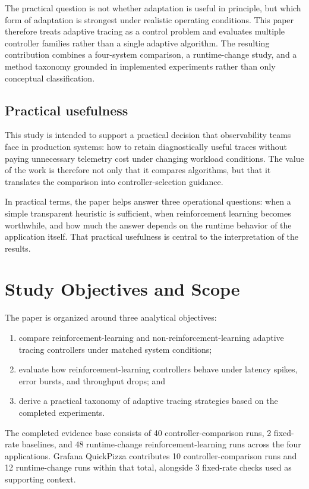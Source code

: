 \documentclass[10pt,twocolumn]{article}
\begin{document}
The practical question is not whether adaptation is useful in principle, but which form of adaptation is strongest under realistic operating conditions. This paper therefore treats adaptive tracing as a control problem and evaluates multiple controller families rather than a single adaptive algorithm. The resulting contribution combines a four-system comparison, a runtime-change study, and a method taxonomy grounded in implemented experiments rather than only conceptual classification.

\subsection{Practical usefulness}
This study is intended to support a practical decision that observability teams face in production systems: how to retain diagnostically useful traces without paying unnecessary telemetry cost under changing workload conditions. The value of the work is therefore not only that it compares algorithms, but that it translates the comparison into controller-selection guidance.

In practical terms, the paper helps answer three operational questions: when a simple transparent heuristic is sufficient, when reinforcement learning becomes worthwhile, and how much the answer depends on the runtime behavior of the application itself. That practical usefulness is central to the interpretation of the results.

\section{Study Objectives and Scope}
The paper is organized around three analytical objectives:
\begin{enumerate}[label=\textbf{Objective \Alph*:}, leftmargin=2.4cm]
  \item compare reinforcement-learning and non-reinforcement-learning adaptive tracing controllers under matched system conditions;
  \item evaluate how reinforcement-learning controllers behave under latency spikes, error bursts, and throughput drops; and
  \item derive a practical taxonomy of adaptive tracing strategies based on the completed experiments.
\end{enumerate}

The completed evidence base consists of 40 controller-comparison runs, 2 fixed-rate baselines, and 48 runtime-change reinforcement-learning runs across the four applications. Grafana QuickPizza contributes 10 controller-comparison runs and 12 runtime-change runs within that total, alongside 3 fixed-rate checks used as supporting context.
\end{document}
